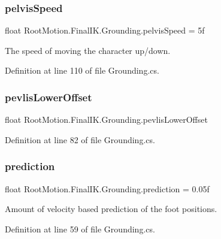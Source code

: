 \subsubsection{\texorpdfstring{pelvis\+Speed}{pelvisSpeed}}
{\footnotesize\ttfamily float Root\+Motion.\+Final\+I\+K.\+Grounding.\+pelvis\+Speed = 5f}



The speed of moving the character up/down. 



Definition at line 110 of file Grounding.\+cs.

\mbox{\label{class_root_motion_1_1_final_i_k_1_1_grounding_a7632b0b532a8d6c0d90117a30d11a34e}} 
\subsubsection{\texorpdfstring{pevlis\+Lower\+Offset}{pevlisLowerOffset}}
{\footnotesize\ttfamily float Root\+Motion.\+Final\+I\+K.\+Grounding.\+pevlis\+Lower\+Offset}



Definition at line 82 of file Grounding.\+cs.

\mbox{\label{class_root_motion_1_1_final_i_k_1_1_grounding_a07790bb79534508da0f58b6b5ab9c540}} 
\subsubsection{\texorpdfstring{prediction}{prediction}}
{\footnotesize\ttfamily float Root\+Motion.\+Final\+I\+K.\+Grounding.\+prediction = 0.\+05f}



Amount of velocity based prediction of the foot positions. 



Definition at line 59 of file Grounding.\+cs.

